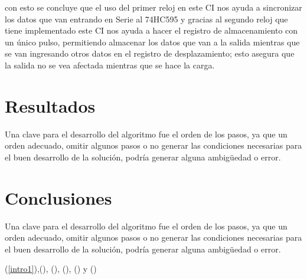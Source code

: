 \documentclass{article}
\begin{document}
con esto se concluye que el uso del primer reloj en este CI nos ayuda a sincronizar los datos que van entrando en Serie al 74HC595 y gracias al segundo reloj que tiene implementado este CI nos ayuda a hacer el registro de almacenamiento con un único pulso, permitiendo almacenar los datos que van a la salida mientras que se van ingresando otros datos en el registro de desplazamiento; esto asegura que la salida no se vea afectada mientras que se hace la carga.


\section{Resultados} \label{conclusiones}
Una clave para el desarrollo del algoritmo fue el orden de los pasos, ya que un orden adecuado, omitir algunos pasos o no generar las condiciones necesarias para el buen desarrollo de la solución, podría generar alguna ambigüedad o error.

\section{Conclusiones} \label{conclusiones}
Una clave para el desarrollo del algoritmo fue el orden de los pasos, ya que un orden adecuado, omitir algunos pasos o no generar las condiciones necesarias para el buen desarrollo de la solución, podría generar alguna ambigüedad o error.



(\ref{intro1}),(\label{intro2}), (\label{investigación}), (\label{practica}), (\label{conclusiones}) y (\label{practica})


\end{document}
